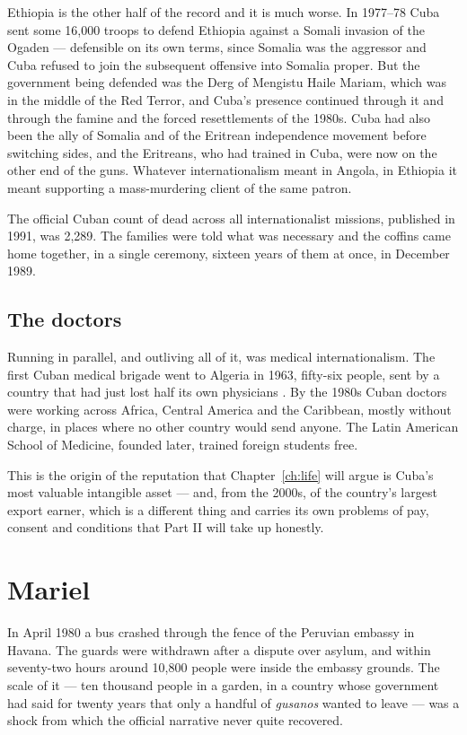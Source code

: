 Ethiopia is the other half of the record and it is much worse. In 1977--78
Cuba sent some 16,000 troops to defend Ethiopia against a Somali invasion of
the Ogaden --- defensible on its own terms, since Somalia was the aggressor and
Cuba refused to join the subsequent offensive into Somalia proper. But the
government being defended was the Derg of Mengistu Haile Mariam, which was in
the middle of the Red Terror, and Cuba's presence continued through it and
through the famine and the forced resettlements of the 1980s. Cuba had also
been the ally of Somalia and of the Eritrean independence movement before
switching sides, and the Eritreans, who had trained in Cuba, were now on the
other end of the guns. Whatever internationalism meant in Angola, in Ethiopia
it meant supporting a mass-murdering client of the same patron.

The official Cuban count of dead across all internationalist missions,
published in 1991, was 2,289.\unv{} The families were told what was necessary
and the coffins came home together, in a single ceremony, sixteen years of them
at once, in December 1989.

\subsection{The doctors}

Running in parallel, and outliving all of it, was medical internationalism.
The first Cuban medical brigade went to Algeria in 1963, fifty-six people, sent
by a country that had just lost half its own physicians \citep{kirk2015}. By the 1980s Cuban
doctors were working across Africa, Central America and the Caribbean, mostly
without charge, in places where no other country would send anyone. The Latin
American School of Medicine, founded later, trained foreign students free.

This is the origin of the reputation that Chapter~\ref{ch:life} will argue is
Cuba's most valuable intangible asset --- and, from the 2000s, of the country's
largest export earner, which is a different thing and carries its own problems
of pay, consent and conditions that Part II will take up honestly.

\section{Mariel}

In April 1980 a bus crashed through the fence of the Peruvian embassy in
Havana. The guards were withdrawn after a dispute over asylum, and within
seventy-two hours around 10,800 people were inside the embassy grounds. The
scale of it --- ten thousand people in a garden, in a country whose government
had said for twenty years that only a handful of \emph{gusanos} wanted to leave
--- was a shock from which the official narrative never quite recovered.

